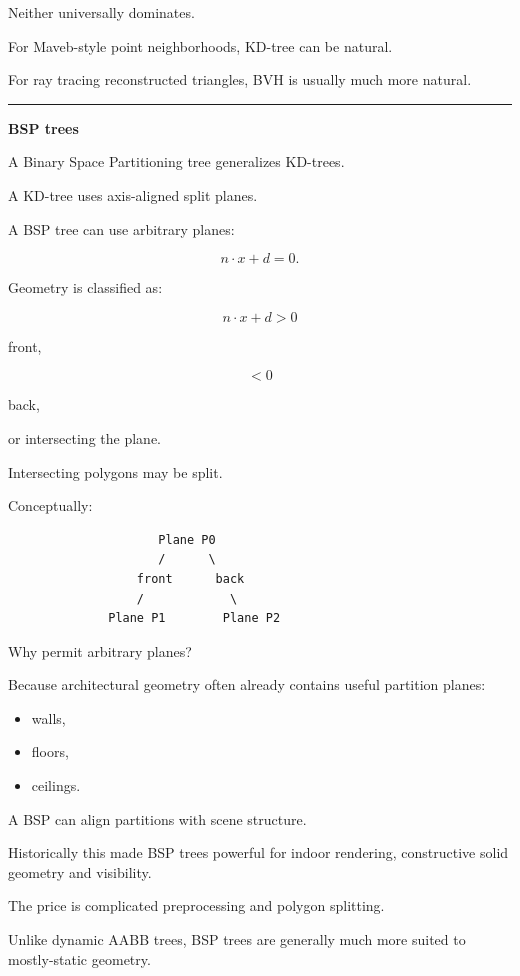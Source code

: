 Neither universally dominates.

For Maveb-style point neighborhoods, KD-tree can be natural.

For ray tracing reconstructed triangles, BVH is usually much more natural.

\begin{center}\rule{0.5\linewidth}{0.5pt}\end{center}

\textbf{BSP trees}

A Binary Space Partitioning tree generalizes KD-trees.

A KD-tree uses axis-aligned split planes.

A BSP tree can use arbitrary planes:

\[
n\cdot x+d=0.
\]

Geometry is classified as:

\[
n\cdot x+d>0
\]

front,

\[
<0
\]

back,

or intersecting the plane.

Intersecting polygons may be split.

Conceptually:

\begin{verbatim}
                     Plane P0
                     /      \
                  front      back
                  /            \
              Plane P1        Plane P2
\end{verbatim}

Why permit arbitrary planes?

Because architectural geometry often already contains useful partition planes:

\begin{itemize}
\tightlist
\item
  walls,
\item
  floors,
\item
  ceilings.
\end{itemize}

A BSP can align partitions with scene structure.

Historically this made BSP trees powerful for indoor rendering, constructive solid geometry and visibility.

The price is complicated preprocessing and polygon splitting.

Unlike dynamic AABB trees, BSP trees are generally much more suited to mostly-static geometry.

